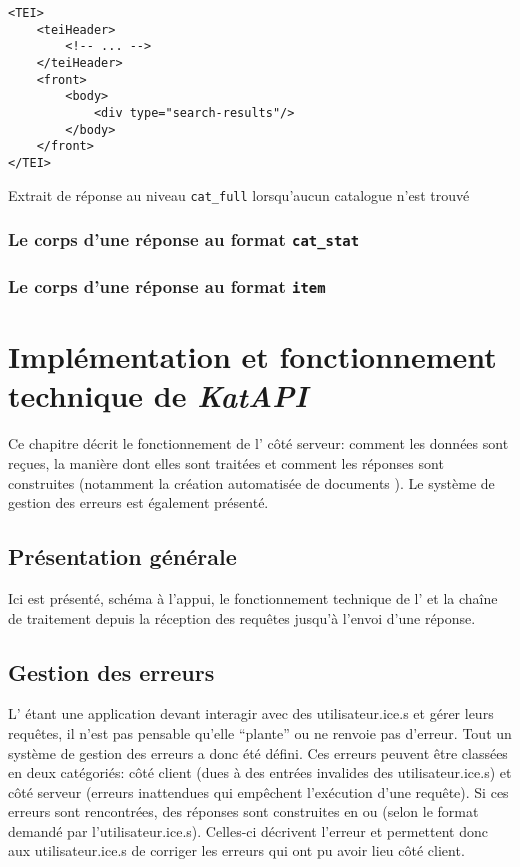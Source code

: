 \begin{listing}[h!]
	\begin{verbatim}
<TEI>
	<teiHeader>
		<!-- ... -->
	</teiHeader>
	<front>
		<body>
			<div type="search-results"/>
		</body>
	</front>
</TEI>
	\end{verbatim}
	\caption{Extrait de réponse au niveau \texttt{cat\_full} lorsqu'aucun catalogue n'est trouvé}
	\label{code:api_cat_full_empty}
\end{listing}

\subsection{Le corps d'une réponse au format \texttt{cat\_stat}}

\subsection{Le corps d'une réponse au format \texttt{item}}

\chapter{Implémentation et fonctionnement technique de \textit{KatAPI}}
Ce chapitre décrit le fonctionnement de l'\api{} côté serveur: comment les données sont reçues, la manière dont elles sont traitées et comment les réponses sont construites (notamment la création automatisée de documents \xmltei{}). Le système de gestion des erreurs est également présenté.

\section{Présentation générale}
Ici est présenté, schéma à l'appui, le fonctionnement technique de l'\api{} et la chaîne de traitement depuis la réception des requêtes jusqu'à l'envoi d'une réponse.

\section{Gestion des erreurs}
L'\api{} étant une application devant interagir avec des utilisateur.ice.s et gérer leurs requêtes, il n'est pas pensable qu'elle \enquote{plante} ou ne renvoie pas d'erreur. Tout un système de gestion des erreurs a donc été défini. Ces erreurs peuvent être classées en deux catégoriés: côté client (dues à des entrées invalides des utilisateur.ice.s)  et côté serveur (erreurs inattendues qui empêchent l'exécution d'une requête). Si ces erreurs sont rencontrées, des réponses sont construites en \json{} ou \xmltei{} (selon le format demandé par l'utilisateur.ice.s). Celles-ci décrivent l'erreur et permettent donc aux utilisateur.ice.s de corriger les erreurs qui ont pu avoir lieu côté client.

